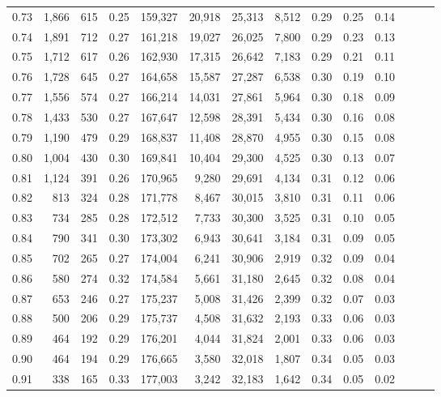 \begin{tabular}{rrrrrrrrrrrrrr}
0.73 &  1,866 &  615 &  0.25 &  159,327 &   20,918 &  25,313 &   8,512 &  0.29 &  0.25 &      0.14 \\
0.74 &  1,891 &  712 &  0.27 &  161,218 &   19,027 &  26,025 &   7,800 &  0.29 &  0.23 &      0.13 \\
0.75 &  1,712 &  617 &  0.26 &  162,930 &   17,315 &  26,642 &   7,183 &  0.29 &  0.21 &      0.11 \\
0.76 &  1,728 &  645 &  0.27 &  164,658 &   15,587 &  27,287 &   6,538 &  0.30 &  0.19 &      0.10 \\
0.77 &  1,556 &  574 &  0.27 &  166,214 &   14,031 &  27,861 &   5,964 &  0.30 &  0.18 &      0.09 \\
0.78 &  1,433 &  530 &  0.27 &  167,647 &   12,598 &  28,391 &   5,434 &  0.30 &  0.16 &      0.08 \\
0.79 &  1,190 &  479 &  0.29 &  168,837 &   11,408 &  28,870 &   4,955 &  0.30 &  0.15 &      0.08 \\
0.80 &  1,004 &  430 &  0.30 &  169,841 &   10,404 &  29,300 &   4,525 &  0.30 &  0.13 &      0.07 \\
0.81 &  1,124 &  391 &  0.26 &  170,965 &    9,280 &  29,691 &   4,134 &  0.31 &  0.12 &      0.06 \\
0.82 &    813 &  324 &  0.28 &  171,778 &    8,467 &  30,015 &   3,810 &  0.31 &  0.11 &      0.06 \\
0.83 &    734 &  285 &  0.28 &  172,512 &    7,733 &  30,300 &   3,525 &  0.31 &  0.10 &      0.05 \\
0.84 &    790 &  341 &  0.30 &  173,302 &    6,943 &  30,641 &   3,184 &  0.31 &  0.09 &      0.05 \\
0.85 &    702 &  265 &  0.27 &  174,004 &    6,241 &  30,906 &   2,919 &  0.32 &  0.09 &      0.04 \\
0.86 &    580 &  274 &  0.32 &  174,584 &    5,661 &  31,180 &   2,645 &  0.32 &  0.08 &      0.04 \\
0.87 &    653 &  246 &  0.27 &  175,237 &    5,008 &  31,426 &   2,399 &  0.32 &  0.07 &      0.03 \\
0.88 &    500 &  206 &  0.29 &  175,737 &    4,508 &  31,632 &   2,193 &  0.33 &  0.06 &      0.03 \\
0.89 &    464 &  192 &  0.29 &  176,201 &    4,044 &  31,824 &   2,001 &  0.33 &  0.06 &      0.03 \\
0.90 &    464 &  194 &  0.29 &  176,665 &    3,580 &  32,018 &   1,807 &  0.34 &  0.05 &      0.03 \\
0.91 &    338 &  165 &  0.33 &  177,003 &    3,242 &  32,183 &   1,642 &  0.34 &  0.05 &      0.02 \\

\end{tabular}
